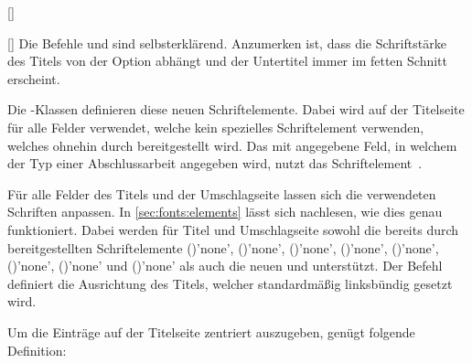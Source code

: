 \begin{Declaration*}{}
\begin{Declaration*}{}
\begin{Declaration*}{}
\begin{Declaration}{[]}
\begin{Declaration}{[]}
\printdeclarationlist%
%
%
Die Befehle  und  sind selbsterklärend. Anzumerken 
ist, dass die Schriftstärke des Titels von der Option  abhängt
und der Untertitel immer im fetten Schnitt erscheint. 
\end{Declaration}
\end{Declaration}

\begin{Declaration}[v2.02]{}
\begin{Declaration}[v2.02]{}
\begin{Declaration}[v2.06]{}
\printdeclarationlist%
%
%
Die \TUDScript-Klassen definieren diese neuen Schriftelemente. Dabei wird 
 auf der Titelseite für alle Felder verwendet, welche kein 
spezielles Schriftelement verwenden, welches ohnehin durch \KOMAScript{} 
bereitgestellt wird. Das mit  angegebene Feld, in welchem der Typ 
einer Abschlussarbeit angegeben wird, nutzt das Schriftelement~. 

Für alle Felder des Titels und der Umschlagseite lassen sich die verwendeten
Schriften anpassen. In \autoref{sec:fonts:elements} lässt sich nachlesen, wie 
dies genau funktioniert. Dabei werden für Titel und Umschlagseite sowohl die 
bereits durch \KOMAScript{} bereitgestellten Schriftelemente
()'none', 
()'none', 
()'none', 
()'none', 
()'none', 
()'none',
()'none' und 
()'none'
als auch die neuen  und  unterstützt.
Der Befehl  definiert die Ausrichtung des Titels, welcher 
standardmäßig linksbündig gesetzt wird.
\begin{Example}
Um die Einträge auf der Titelseite zentriert auszugeben, genügt folgende 
Definition:
\begin{Code}
\let\raggedtitle\centering
\end{Code}
\end{Example}
\end{Declaration}
\end{Declaration}
\end{Declaration}


\end{Declaration*}
\end{Declaration*}
\end{Declaration*}
